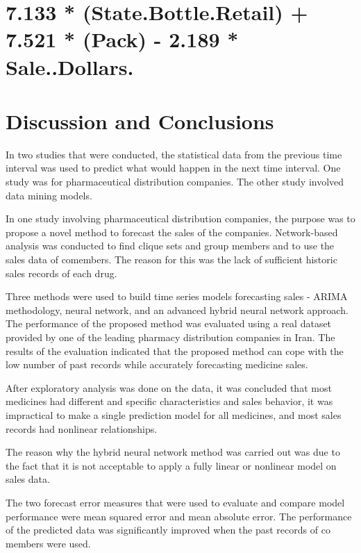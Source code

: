 \documentclass[]{elsarticle} %
\begin{document}
\section{7.133 * (State.Bottle.Retail) + 7.521 * (Pack) - 2.189 *
Sale..Dollars.}\label{state.bottle.retail-7.521-pack---2.189-sale..dollars.}

\section{Discussion and Conclusions}\label{discussion-and-conclusions}

In two studies that were conducted, the statistical data from the
previous time interval was used to predict what would happen in the next
time interval. One study was for pharmaceutical distribution companies.
The other study involved data mining models.

In one study involving pharmaceutical distribution companies, the
purpose was to propose a novel method to forecast the sales of the
companies. Network-based analysis was conducted to find clique sets and
group members and to use the sales data of comembers. The reason for
this was the lack of sufficient historic sales records of each drug.

Three methods were used to build time series models forecasting sales -
ARIMA methodology, neural network, and an advanced hybrid neural network
approach. The performance of the proposed method was evaluated using a
real dataset provided by one of the leading pharmacy distribution
companies in Iran. The results of the evaluation indicated that the
proposed method can cope with the low number of past records while
accurately forecasting medicine sales.

After exploratory analysis was done on the data, it was concluded that
most medicines had different and specific characteristics and sales
behavior, it was impractical to make a single prediction model for all
medicines, and most sales records had nonlinear relationships.

The reason why the hybrid neural network method was carried out was due
to the fact that it is not acceptable to apply a fully linear or
nonlinear model on sales data.

The two forecast error measures that were used to evaluate and compare
model performance were mean squared error and mean absolute error. The
performance of the predicted data was significantly improved when the
past records of co members were used.
\end{document}
